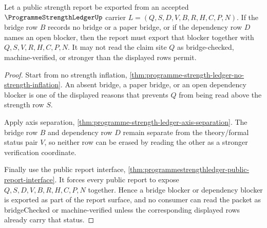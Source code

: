\begin{theorem}
\label{thm:programme-strength-ledger-bridge-blocker-readback}
Let a public strength report be exported from an accepted $\ProgrammeStrengthLedgerUp$ carrier $L=(Q,S,D,V,B,R,H,C,P,N)$. If the bridge row $B$ records no bridge or a paper bridge, or if the dependency row $D$ names an open blocker, then the report must export that blocker together with $Q,S,V,R,H,C,P,N$. It may not read the claim site $Q$ as bridge-checked, machine-verified, or stronger than the displayed rows permit.
\end{theorem}
\begin{proof}
Start from no strength inflation, \autoref{thm:programme-strength-ledger-no-strength-inflation}. An absent bridge, a paper bridge, or an open dependency blocker is one of the displayed reasons that prevents $Q$ from being read above the strength row $S$.

Apply axis separation, \autoref{thm:programme-strength-ledger-axis-separation}. The bridge row $B$ and dependency row $D$ remain separate from the theory/formal status pair $V$, so neither row can be erased by reading the other as a stronger verification coordinate.

Finally use the public report interface, \autoref{thm:programmestrengthledger-public-report-interface}. It forces every public report to expose $Q,S,D,V,B,R,H,C,P,N$ together. Hence a bridge blocker or dependency blocker is exported as part of the report surface, and no consumer can read the packet as bridgeChecked or machine-verified unless the corresponding displayed rows already carry that status.
\end{proof}

